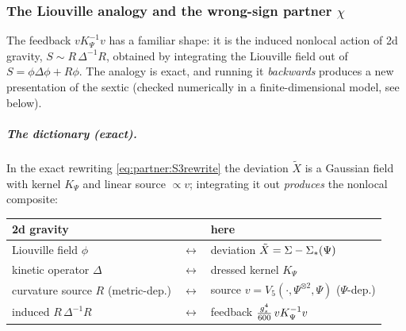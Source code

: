\subsubsection{The Liouville analogy and the wrong-sign partner
\texorpdfstring{$\chi$}{chi}}
\label{ped:sec:milestones:chi}

The feedback $vK_\Psi^{-1}v$ has a familiar shape: it is the induced nonlocal action of
2d gravity, $S\sim R\,\Delta^{-1}R$, obtained by integrating the Liouville field out of
$S=\phi\Delta\phi+R\phi$. The analogy is exact, and
running it \emph{backwards} produces a new presentation of the sextic
(checked numerically in a finite-dimensional model, see below).

\subparagraph{The dictionary (exact).} In the exact rewriting \eqref{eq:partner:S3rewrite} the
deviation $\tilde X$ is a Gaussian field with kernel $K_\Psi$ and linear source
$\propto v$; integrating it out \emph{produces} the nonlocal composite:
\begin{center}
	\begin{tabular}{lcl}
		\toprule
		2d gravity & & here \\
		\midrule
		Liouville field $\phi$ & $\leftrightarrow$ & deviation $\tilde X=\Sigma-\Sigma_*(\Psi)$ \\
		kinetic operator $\Delta$ & $\leftrightarrow$ & dressed kernel $K_\Psi$ \\
		curvature source $R$ (metric-dep.) & $\leftrightarrow$ & source $v=V_5(\cdot,\Psi^{\otimes2},\Psi)$ ($\Psi$-dep.) \\
		induced $R\,\Delta^{-1}R$ & $\leftrightarrow$ & feedback $\tfrac{g_s^4}{600}\,vK_\Psi^{-1}v$ \\
		\bottomrule
	\end{tabular}
\end{center}

